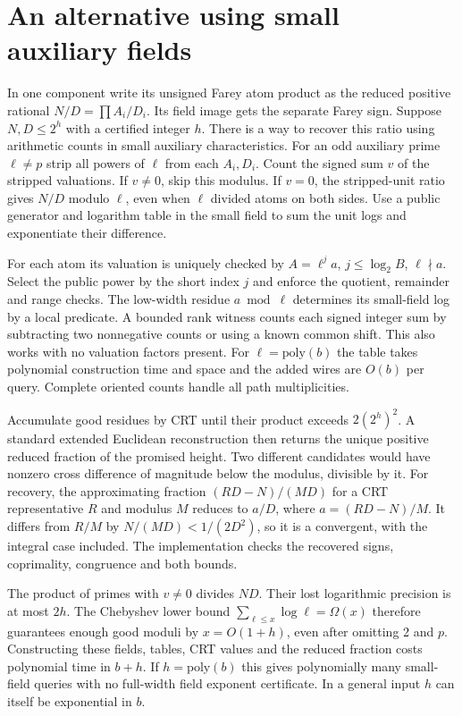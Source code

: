 \documentclass[11pt]{article}
\begin{document}
\section{An alternative using small auxiliary fields}
In one component write its unsigned Farey atom product as the
reduced positive rational $N/D=\prod A_i/D_i$. Its field image
gets the separate Farey sign. Suppose $N,D\le 2^h$ with a certified
integer $h$. There is a way to recover this ratio using arithmetic
counts in small auxiliary characteristics. For an odd auxiliary
prime $\ell\ne p$ strip all powers of $\ell$ from each $A_i,D_i$.
Count the signed sum $v$ of the stripped valuations. If $v\ne0$,
skip this modulus. If $v=0$, the stripped-unit ratio gives $N/D$
modulo $\ell$, even when $\ell$ divided atoms on both sides.
Use a public generator and logarithm table in the small field to
sum the unit logs and exponentiate their difference.

For each atom its valuation is uniquely checked by
$A=\ell^j a$, $j\le\log_2 B$, $\ell\nmid a$. Select the public
power by the short index $j$ and enforce the quotient, remainder
and range checks. The low-width residue $a\bmod\ell$ determines
its small-field log by a local predicate. A bounded rank witness
counts each signed integer sum by subtracting two nonnegative
counts or using a known common shift. This also works with no
valuation factors present. For $\ell=\mathrm{poly}(b)$ the table
takes polynomial construction time and space and the added wires
are $O(b)$ per query. Complete oriented counts handle all path
multiplicities.

Accumulate good residues by CRT until their product exceeds
$2(2^h)^2$. A standard extended Euclidean reconstruction then
returns the unique positive reduced fraction of the promised
height. Two different candidates would have nonzero cross
difference of magnitude below the modulus, divisible by it.
For recovery, the approximating fraction
$(RD-N)/(MD)$ for a CRT representative $R$ and modulus $M$
reduces to $a/D$, where $a=(RD-N)/M$. It differs from $R/M$
by $N/(MD)<1/(2D^2)$, so it is a convergent, with the integral
case included. The implementation checks the recovered signs,
coprimality, congruence and both bounds.

The product of primes with $v\ne0$ divides $ND$. Their lost
logarithmic precision is at most $2h$. The Chebyshev lower bound
$\sum_{\ell\le x}\log\ell=\Omega(x)$ therefore guarantees enough
good moduli by $x=O(1+h)$, even after omitting 2 and $p$.
Constructing these fields, tables, CRT values and the reduced
fraction costs polynomial time in $b+h$. If $h=\mathrm{poly}(b)$
this gives polynomially many small-field queries with no full-width
field exponent certificate. In a general input $h$ can itself be
exponential in $b$.
\end{document}
